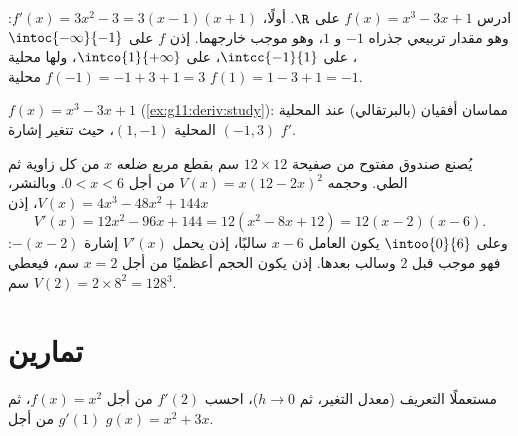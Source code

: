 \begin{example}\label{ex:g11:deriv:study}
ادرس $f(x) = x^3 - 3x + 1$ على $\R$. أولًا،
$f'(x) = 3x^2 - 3 = 3(x-1)(x+1)$: وهو مقدار تربيعي جذراه $-1$ و $1$،
وهو موجب خارجهما. إذن $f$  على $\intoc{-\infty}{-1}$،
 على $\intcc{-1}{1}$،  على $\intco{1}{+\infty}$، ولها
 محلية $f(-1) = -1 + 3 + 1 = 3$  محلية
$f(1) = 1 - 3 + 1 = -1$.
\end{example}

\begin{omfigure}

{\small {} $f(x) = x^3 - 3x + 1$
(\cref{ex:g11:deriv:study}): مماسان أفقيان (بالبرتقالي) عند 
المحلية $(-1, 3)$  المحلية $(1, -1)$، حيث تتغير إشارة $f'$.}
\end{omfigure}

\begin{example}[الاستمثال]\label{ex:g11:deriv:box}
يُصنع صندوق مفتوح من صفيحة $12 \times 12$ سم بقطع مربع
ضلعه $x$ من كل زاوية ثم الطي. وحجمه
$V(x) = x(12 - 2x)^2$ من أجل $0 < x < 6$. وبالنشر،
$V(x) = 4x^3 - 48x^2 + 144x$، إذن
\[
V'(x) = 12x^2 - 96x + 144 = 12(x^2 - 8x + 12) = 12(x - 2)(x - 6).
\]
وعلى $\intoo{0}{6}$ يكون العامل $x - 6$ سالبًا، إذن يحمل $V'(x)$ إشارة
$-(x-2)$: فهو موجب قبل $2$ وسالب بعدها. إذن يكون الحجم أعظميًا
من أجل $x = 2$ سم، فيعطي $V(2) = 2 \times 8^2 = 128$ سم$^3$.
\end{example}

\section{تمارين}

\begin{exercise}[$\star$]\label{exo:g11:deriv:1}
مستعملًا التعريف (معدل التغير، ثم $h \to 0$)، احسب $f'(2)$ من أجل
$f(x) = x^2$، ثم $g'(1)$ من أجل $g(x) = x^2 + 3x$.
\end{exercise}

